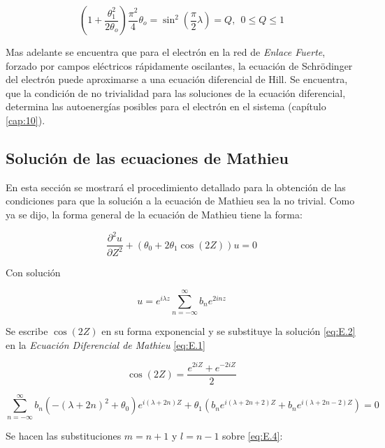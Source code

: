 \begin{equation}\label{eq:4.7}
(1+\frac{\theta_1^2}{2\theta_o})\frac{\pi^2}{4}\theta_o=\sin^2(\frac{\pi}{2}\lambda) = Q, \ \  0 \leq Q \leq 1
\end{equation}

Mas adelante se encuentra que para el electrón en la red de \textit{Enlace Fuerte}, forzado por campos eléctricos rápidamente oscilantes, la ecuación de Schrödinger del electrón puede aproximarse a una ecuación diferencial de Hill. Se encuentra, que la condición de no trivialidad para las soluciones de la ecuación diferencial, determina las autoenergías posibles para el electrón en el sistema (capítulo \ref{cap:10}). 

\subsection{Solución de las ecuaciones de Mathieu}

En esta sección se mostrará el procedimiento detallado para la obtención de las condiciones para que la solución a la ecuación de Mathieu sea la no trivial. Como ya se dijo, la forma general de la ecuación de Mathieu tiene la forma:

\begin{equation}\label{eq:E.1}
    \frac{\partial^2u}{\partial Z^2}+\left(\theta_0+2\theta_1\cos(2Z)\right)u=0
\end{equation}

Con solución 

\begin{equation}\label{eq:E.2}
    u=e^{i\lambda z}\sum^{\infty}_{n=-\infty} b_n e^{2inz}
\end{equation}

Se escribe  $\cos(2Z)$ en su forma exponencial y se substituye la solución \ref{eq:E.2} en la \textit{Ecuación Diferencial de Mathieu} \ref{eq:E.1} 


\begin{equation}\label{eq:E.3}
    \cos(2Z)=\frac{e^{2iZ}+e^{-2iZ}}{2}
\end{equation}

\begin{equation}\label{eq:E.4}
    \sum^{\infty}_{n=-\infty} b_n\left(-(\lambda+2n)^2+\theta_0\right)e^{i\left(\lambda+2n\right) Z}+\theta_1\left( b_ne^{i\left(\lambda+2n+2\right)Z}+b_ne^{i\left(\lambda+2n-2\right)Z}\right)=0
\end{equation}

Se hacen las substituciones $m=n+1$ y $l=n-1$ sobre \ref{eq:E.4}:

